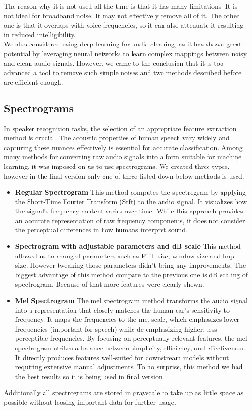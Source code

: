 \documentclass[11pt, letterpaper]{article}
\begin{document}
The reason why it is not used all the time is that it has many limitations. It is not ideal for broadband noise. It may not effectively remove all of it. The other one is that it overlaps with voice frequencies, so it can also attenuate it resulting in reduced intelligibility.\\We also considered using deep learning for audio cleaning, as it has shown great potential by leveraging neural networks to learn complex mappings between noisy and clean audio signals. However, we came to the conclusion that it is too advanced a tool to remove such simple noises and two methods described before are efficient enough.

\subsection{Spectrograms}
In speaker recognition tasks, the selection of an appropriate feature extraction method is crucial. The acoustic properties of human speech vary widely and capturing these nuances effectively is essential for accurate classification. Among many methods for converting raw audio signals into a form suitable for machine learning, it was imposed on us to use spectrograms. We created three types, however in the final version only one of three listed down below methods is used.
\begin{itemize}
    \item \textbf{Regular Spectrogram}
        This method computes the spectrogram by applying the Short-Time Fourier Transform (Stft) to the audio signal. It visualizes how the signal's frequency content varies over time. While this approach provides an accurate representation of raw frequency components, it does not consider the perceptual differences in how humans interpret sound.
    \item \textbf{Spectrogram with adjustable parameters and dB scale}
        This method allowed us to changed parameters such as FTT size, window size and hop size. However tweaking those parameters didn't bring any improvements. The biggest advantage of this method compare to the previous one is dB scaling of spectrogram. Because of that more features were clearly shown.
    \item \textbf{Mel Spectrogram}
        The mel spectrogram method transforms the audio signal into a representation that closely matches the human ear's sensitivity to frequency. It maps the frequencies to the mel scale, which emphasizes lower frequencies (important for speech) while de-emphasizing higher, less perceptible frequencies. By focusing on perceptually relevant features, the mel spectrogram strikes a balance between simplicity, efficiency, and effectiveness. It directly produces features well-suited for downstream models without requiring extensive manual adjustments. To no surprise, this method we had the best results so it is being used in final version.
\end{itemize}
Additionally all spectrograms are stored in grayscale to take up as little space as possible without loosing important data for further usage.
\end{document}
